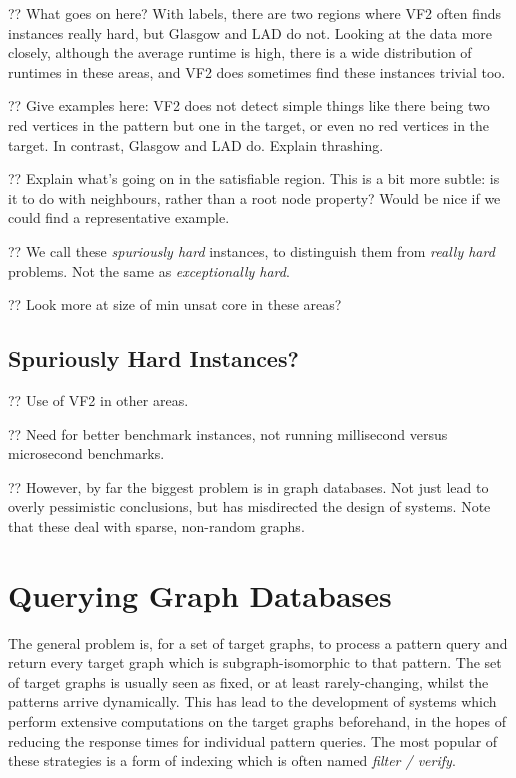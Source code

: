 \documentclass[twoside,11pt]{article}
\begin{document}
?? What goes on here? With labels, there are two regions where VF2 often finds instances really
hard, but Glasgow and LAD do not. Looking at the data more closely, although the average runtime is
high, there is a wide distribution of runtimes in these areas, and VF2 does sometimes find these
instances trivial too.

?? Give examples here: VF2 does not detect simple things like there being two red vertices in the
pattern but one in the target, or even no red vertices in the target. In contrast, Glasgow and LAD
do. Explain thrashing.

?? Explain what's going on in the satisfiable region. This is a bit more subtle: is it to do with
neighbours, rather than a root node property? Would be nice if we could find a representative
example.

?? We call these \emph{spuriously hard} instances, to distinguish them from \emph{really hard}
problems. Not the same as \emph{exceptionally hard}.

?? Look more at size of min unsat core in these areas?

\subsection{Spuriously Hard Instances?}

?? Use of VF2 in other areas.

?? Need for better benchmark instances, not running millisecond versus microsecond benchmarks.

?? However, by far the biggest problem is in graph databases. Not just lead to overly pessimistic
conclusions, but has misdirected the design of systems. Note that these deal with sparse, non-random
graphs.

\section{Querying Graph Databases}\label{section:filterverify}

The general problem is, for a set of target graphs, to process a pattern query and return every
target graph which is subgraph-isomorphic to that pattern. The set of target graphs is usually seen
as fixed, or at least rarely-changing, whilst the patterns arrive dynamically. This has lead to the
development of systems which perform extensive computations on the target graphs beforehand, in the
hopes of reducing the response times for individual pattern queries. The most popular of these
strategies is a form of indexing which is often named \emph{filter / verify}.
\end{document}
